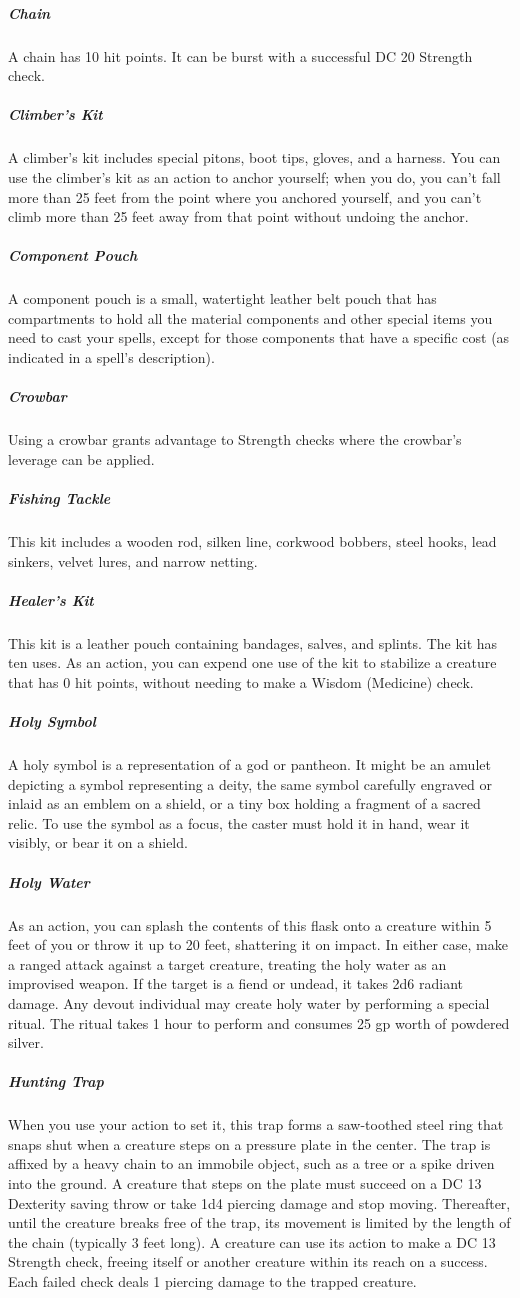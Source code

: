 \subparagraph*{Chain} A chain has 10 hit points. It can be burst with a successful DC 20 Strength check.

\subparagraph*{Climber's Kit} A climber's kit includes special pitons, boot tips, gloves, and a harness. You can use the climber's kit as an action to anchor yourself; when you do, you can't fall more than 25 feet from the point where you anchored yourself, and you can't climb more than 25 feet away from that point without undoing the anchor.

\subparagraph*{Component Pouch} A component pouch is a small, watertight leather belt pouch that has compartments to hold all the material components and other special items you need to cast your spells, except for those components that have a specific cost (as indicated in a spell's description).
\subparagraph*{Crowbar} Using a crowbar grants advantage to Strength checks where the crowbar's leverage can be applied.

\subparagraph*{Fishing Tackle} This kit includes a wooden rod, silken line, corkwood bobbers, steel hooks, lead sinkers, velvet lures, and narrow netting.
\subparagraph*{Healer's Kit} This kit is a leather pouch containing bandages, salves, and splints. The kit has ten uses. As an action, you can expend one use of the kit to stabilize a creature that has 0 hit points, without needing to make a Wisdom (Medicine) check.

\subparagraph*{Holy Symbol} A holy symbol is a representation of a god or pantheon. It might be an amulet depicting a symbol representing a deity, the same symbol carefully engraved or inlaid as an emblem on a shield, or a tiny box holding a fragment of a sacred relic. To use the symbol as a focus, the caster must hold it in hand, wear it visibly, or bear it on a shield.

\subparagraph*{Holy Water} As an action, you can splash the contents of this flask onto a creature within 5 feet of you or throw it up to 20 feet, shattering it on impact. In either case, make a ranged attack against a target creature, treating the holy water as an improvised weapon. If the target is a fiend or undead, it takes 2d6 radiant damage.
Any devout individual may create holy water by performing a special ritual. The ritual takes 1 hour to perform and consumes 25 gp worth of powdered silver.

\subparagraph*{Hunting Trap} When you use your action to set it, this trap forms a saw-toothed steel ring that snaps shut when a creature steps on a pressure plate in the center. The trap is affixed by a heavy chain to an immobile object, such as a tree or a spike driven into the ground. A creature that steps on the plate must succeed on a DC 13 Dexterity saving throw or take 1d4 piercing damage and stop moving. Thereafter, until the creature breaks free of the trap, its movement is limited by the length of the chain (typically 3 feet long). A creature can use its action to make a DC 13 Strength check, freeing itself or another creature within its reach on a success. Each failed check deals 1 piercing damage to the trapped creature.

